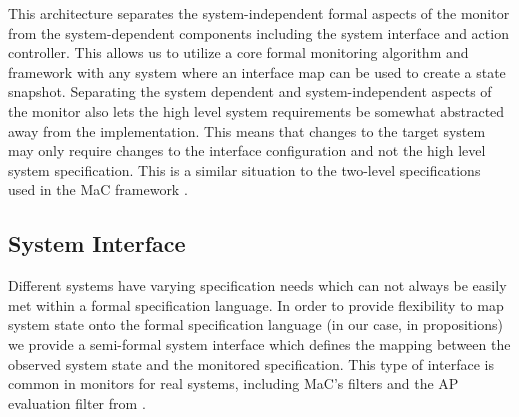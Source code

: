 This architecture separates the system-independent formal aspects of the monitor from the system-dependent components including the system interface and action controller. 
This allows us to utilize a core formal monitoring algorithm and framework with any system where an interface map can be used to create a state snapshot.
Separating the system dependent and system-independent aspects of the monitor also lets the high level system requirements be somewhat abstracted away from the implementation. This means that changes to the target system may only require changes to the interface configuration and not the high level system specification. This is a similar situation to the two-level specifications used in the MaC framework \cite{Kim2004}.

\subsection{System Interface}
Different systems have varying specification needs which can not always be easily met within a formal specification language. In order to provide flexibility to map system state onto the formal specification language (in our case, in propositions) we provide a semi-formal system interface which defines the mapping between the observed system state and the monitored specification. This type of interface is common in monitors for real systems, including MaC's filters \cite{Kim2004} and the AP evaluation filter from \cite{Heffernan2014}.
